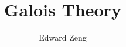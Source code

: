 
\title{Galois Theory}
\author{Edward Zeng}


    \maketitle
    \tableofcontents
    \newpage
    \pagestyle{fancy}
    



